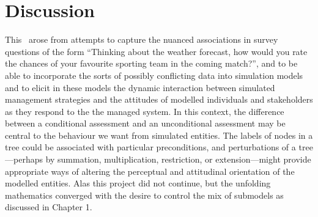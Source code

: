 






\section{Discussion}

This \rng\ arose from attempts to capture the nuanced associations
in survey questions of the form ``Thinking about the weather forecast,
how would you rate the chances of your favourite sporting team in the
coming match?'', and to be able to incorporate the sorts of possibly
conflicting data into simulation models and to elicit in these models
the dynamic interaction between simulated management strategies and
the attitudes of modelled individuals and stakeholders as they respond
to the the managed system.  In this context, the difference between a
conditional assessment and an unconditional assessment may be central
to the behaviour we want from simulated entities.  The labels of nodes
in a tree could be associated with particular preconditions, and
perturbations of a tree---perhaps by summation, multiplication,
restriction, or extension---might provide appropriate ways of altering
the perceptual and attitudinal orientation of the modelled entities.
Alas this project did not continue, but the unfolding mathematics
converged with the desire to control the mix of submodels as discussed
in Chapter 1.



